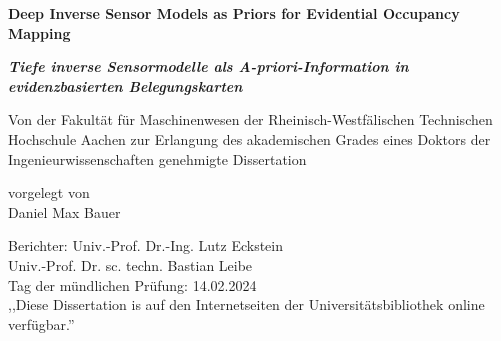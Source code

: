 
\begin{titlepage}
  \centering
  \begin{minipage}[t]{9.8cm}
      \begin{center}
          {\large \textbf{Deep Inverse Sensor Models as Priors for Evidential Occupancy Mapping}}
          \bigskip
      \end{center}
  \end{minipage}
  \begin{minipage}[t]{9.8cm}
      \begin{center}
          {\large \textcolor{ikagrey}{\textit{\textbf{Tiefe inverse Sensormodelle als A-priori-Information in evidenzbasierten Belegungskarten}}}}
          \bigskip
      \end{center}
  \end{minipage}
  \vfill
  \begin{minipage}[t]{16.5cm}
      \begin{center}
          Von der Fakultät für Maschinenwesen der Rheinisch-Westfälischen Technischen Hochschule Aachen zur Erlangung des akademischen Grades eines Doktors der Ingenieurwissenschaften genehmigte Dissertation
      \end{center}
  \end{minipage}
  \vfill
  \begin{minipage}[t]{9.8cm}
      \begin{center}
      	vorgelegt von\\
      	\vspace{\baselineskip}
          Daniel Max Bauer
      \end{center}
  \end{minipage}
\vfill
\begin{minipage}[t]{16.5cm}
	\raggedright
	Berichter: Univ.-Prof. Dr.-Ing. Lutz Eckstein\\
	\phantom{Berichter:} Univ.-Prof. Dr. sc. techn. Bastian Leibe\\ 
	\vspace{\baselineskip}
	Tag der mündlichen Prüfung: 14.02.2024\\
	\vspace{\baselineskip}
	,,Diese Dissertation is auf den Internetseiten der Universitätsbibliothek online verfügbar.''
\end{minipage}
\vfill
\end{titlepage}
\restoregeometry

